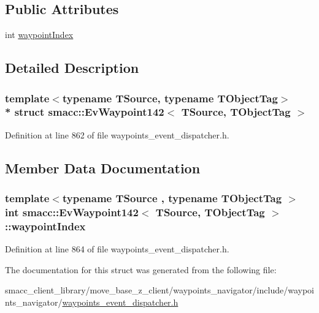 \subsection*{Public Attributes}
\begin{DoxyCompactItemize}
\item 
int \hyperlink{structsmacc_1_1EvWaypoint142_a190d34b880f2d67a2fe6464c61d2d07b}{waypoint\+Index}
\end{DoxyCompactItemize}


\subsection{Detailed Description}
\subsubsection*{template$<$typename T\+Source, typename T\+Object\+Tag$>$\\*
struct smacc\+::\+Ev\+Waypoint142$<$ T\+Source, T\+Object\+Tag $>$}



Definition at line 862 of file waypoints\+\_\+event\+\_\+dispatcher.\+h.



\subsection{Member Data Documentation}
\subsubsection[{\texorpdfstring{waypoint\+Index}{waypointIndex}}]{\setlength{\rightskip}{0pt plus 5cm}template$<$typename T\+Source , typename T\+Object\+Tag $>$ int {\bf smacc\+::\+Ev\+Waypoint142}$<$ T\+Source, T\+Object\+Tag $>$\+::waypoint\+Index}\hypertarget{structsmacc_1_1EvWaypoint142_a190d34b880f2d67a2fe6464c61d2d07b}{}\label{structsmacc_1_1EvWaypoint142_a190d34b880f2d67a2fe6464c61d2d07b}


Definition at line 864 of file waypoints\+\_\+event\+\_\+dispatcher.\+h.



The documentation for this struct was generated from the following file\+:\begin{DoxyCompactItemize}
\item 
smacc\+\_\+client\+\_\+library/move\+\_\+base\+\_\+z\+\_\+client/waypoints\+\_\+navigator/include/waypoints\+\_\+navigator/\hyperlink{waypoints__event__dispatcher_8h}{waypoints\+\_\+event\+\_\+dispatcher.\+h}\end{DoxyCompactItemize}
